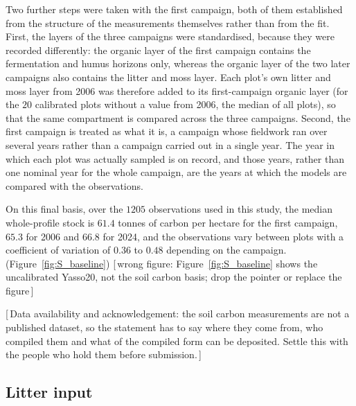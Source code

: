 \documentclass[11pt]{article}
\newcommand{\gap}[1]{\textcolor{red!70!black}{\small[\,#1\,]}}
\begin{document}
Two further steps were taken with the first campaign, both of them established from the
structure of the measurements themselves rather than from the fit. First, the layers of the
three campaigns were standardised, because they were recorded differently: the organic layer
of the first campaign contains the fermentation and humus horizons only, whereas the organic
layer of the two later campaigns also contains the litter and moss layer. Each plot's own
litter and moss layer from 2006 was therefore added to its first-campaign organic layer (for
the $20$ calibrated plots without a value from 2006, the median of all plots), so
that the same compartment is compared across the three campaigns. Second, the first campaign
is treated as what it is, a campaign whose fieldwork ran over several years rather than a
campaign carried out in a single year. The year in which each plot was actually sampled is on
record, and those years, rather than one nominal year for the whole campaign, are the years
at which the models are compared with the observations.

On this final basis, over the $1205$ observations used in this study, the median whole-profile
stock is $61.4$ tonnes of carbon per hectare for the first campaign, $65.3$ for 2006 and $66.8$
for 2024, and the observations vary between plots with a coefficient of variation of $0.36$ to
$0.48$ depending on the campaign.
(Figure~\ref{fig:S_baseline}) \gap{wrong figure: Figure~\ref{fig:S_baseline} shows the uncalibrated Yasso20, not the soil carbon basis; drop the pointer or replace the figure}

\gap{Data availability and acknowledgement: the soil carbon measurements are not a published
dataset, so the statement has to say where they come from, who compiled them and what of the
compiled form can be deposited. Settle this with the people who hold them before
submission.}

\subsection{Litter input}\label{sec:litter}
\end{document}
